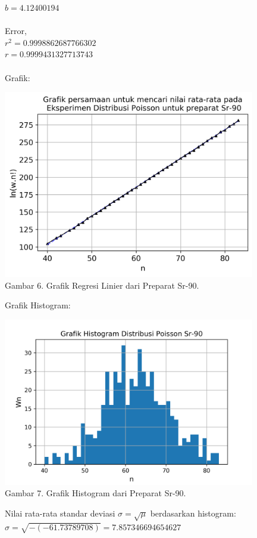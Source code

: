 \documentclass{article}
\begin{document}
			$b =4.12400194 $ \\ \\
			Error,\\
			$r^{2} = 0.9998862687766302$ \\
			$r = 0.9999431327713743$ \\ \\
			Grafik: 
			\begin{center}
				\includegraphics[width=110mm]{Data/Sr-90-Graph.png}\\
				Gambar 6. Grafik Regresi Linier dari Preparat Sr-90.
			\end{center}\newpage
			Grafik Histogram:
			\begin{center}
				\includegraphics[width=110mm]{Data/Sr-90.png}\\
				Gambar 7. Grafik Histogram dari Preparat Sr-90.
			\end{center} 
			Nilai rata-rata standar deviasi $\sigma = \sqrt{\mu}$ berdasarkan histogram:\\
			$\sigma = \sqrt{-(-61.73789708)} = 7.857346694654627$
				
\end{document}
